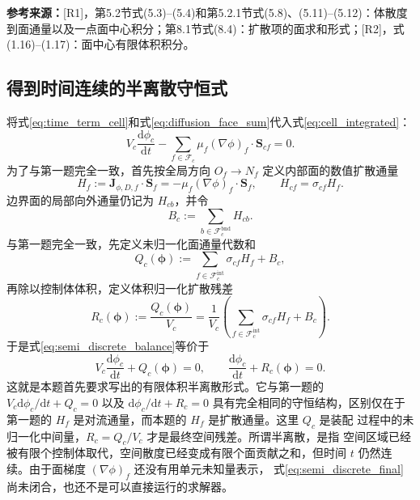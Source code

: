 \documentclass[UTF8,12pt,a4paper]{ctexart}
\numberwithin{equation}{section}
\newcommand{\Rone}{\textnormal{[R1]}}
\newcommand{\Rtwo}{\textnormal{[R2]}}
\newcommand{\source}[1]{%
  \par\smallskip
  \noindent\colorbox{sourcebg}{%
    \parbox{0.955\linewidth}{\raggedright\footnotesize\color{sourcegray}\textbf{参考来源：}#1}%
  }
  \par\smallskip
}
\newcommand{\Sf}{\bm S}
\begin{document}
\source{\Rone，第5.2节式(5.3)--(5.4)和第5.2.1节式(5.8)、(5.11)--(5.12)：体散度到面通量以及一点面中心积分；第8.1节式(8.4)：扩散项的面求和形式；\Rtwo，式(1.16)--(1.17)：面中心有限体积积分。}

\subsection{得到时间连续的半离散守恒式}

将式\eqref{eq:time_term_cell}和式\eqref{eq:diffusion_face_sum}代入式\eqref{eq:cell_integrated}：
\begin{equation}
  V_c\frac{\mathrm d\phi_c}{\mathrm dt}
  -\sum_{f\in\mathcal F_c}
  \mu_f(\nabla\phi)_f\cdot\Sf_{cf}=0.
  \label{eq:semi_discrete_balance}
\end{equation}
为了与第一题完全一致，首先按全局方向 $O_f\to N_f$ 定义内部面的数值扩散通量
\begin{equation}
  \boxed{
  H_f:=\bm J_{\phi,D,f}\cdot\Sf_f
  =-\mu_f(\nabla\phi)_f\cdot\Sf_f,
  \qquad
  H_{cf}=\sigma_{cf}H_f}.
  \label{eq:diffusive_numerical_flux}
\end{equation}
边界面的局部向外通量仍记为 $H_{cb}$，并令
\begin{equation}
  B_c:=\sum_{b\in\mathcal F_c^{\mathrm{bnd}}}H_{cb}.
  \label{eq:boundary_residual_definition}
\end{equation}
与第一题完全一致，先定义未归一化面通量代数和
\begin{equation}
  \boxed{
  Q_c(\bm\phi)
  :=\sum_{f\in\mathcal F_c^{\mathrm{int}}}\sigma_{cf}H_f+B_c},
  \label{eq:diffusive_face_sum}
\end{equation}
再除以控制体体积，定义体积归一化扩散残差
\begin{equation}
  \boxed{
  R_c(\bm\phi):=\frac{Q_c(\bm\phi)}{V_c}
  =\frac{1}{V_c}
  \left(\sum_{f\in\mathcal F_c^{\mathrm{int}}}\sigma_{cf}H_f+B_c\right)}.
  \label{eq:diffusive_residual}
\end{equation}
于是式\eqref{eq:semi_discrete_balance}等价于
\begin{equation}
  \boxed{
  V_c\frac{\mathrm d\phi_c}{\mathrm dt}
  +Q_c(\bm\phi)=0,
  \qquad
  \frac{\mathrm d\phi_c}{\mathrm dt}
  +R_c(\bm\phi)=0}.
  \label{eq:semi_discrete_final}
\end{equation}
这就是本题首先要求写出的有限体积半离散形式。它与第一题的
$V_c\mathrm d\phi_c/\mathrm dt+Q_c=0$ 以及
$\mathrm d\phi_c/\mathrm dt+R_c=0$ 具有完全相同的守恒结构，区别仅在于
第一题的 $H_f$ 是对流通量，而本题的 $H_f$ 是扩散通量。这里 $Q_c$ 是装配
过程中的未归一化中间量，$R_c=Q_c/V_c$ 才是最终空间残差。所谓半离散，是指
空间区域已经被有限个控制体取代，空间散度已经变成有限个面贡献之和，但时间
$t$ 仍然连续。由于面梯度 $(\nabla\phi)_f$ 还没有用单元未知量表示，
式\eqref{eq:semi_discrete_final}尚未闭合，也还不是可以直接运行的求解器。
\end{document}
